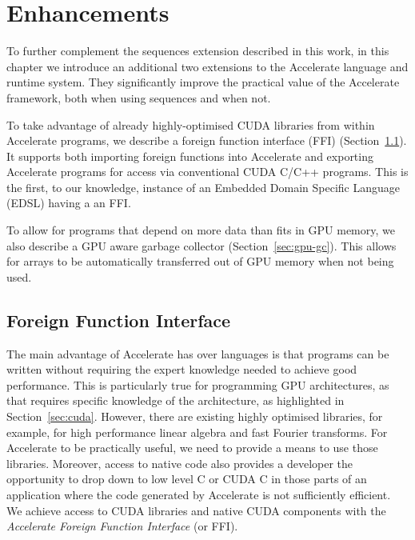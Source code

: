 \chapter{Enhancements}
\label{chap:enhancements}

To further complement the sequences extension described in this work, in this chapter we introduce an additional two extensions to the Accelerate language and runtime system. They significantly improve the practical value of the Accelerate framework, both when using sequences and when not.

To take advantage of already highly-optimised CUDA libraries from within Accelerate programs, we describe a foreign function interface (FFI) (Section~\ref{sec:foreign}). It supports both importing foreign functions into Accelerate and exporting Accelerate programs for access via conventional CUDA C/C++ programs. This is the first, to our knowledge, instance of an Embedded Domain Specific Language (EDSL) having a an FFI.

To allow for programs that depend on more data than fits in GPU memory, we also describe a GPU aware garbage collector (Section~\ref{sec:gpu-gc}). This allows for arrays to be automatically transferred out of GPU memory when not being used.


\section{Foreign Function Interface}
\label{sec:foreign}


The main advantage of Accelerate has over languages is that programs can be written without requiring the expert knowledge needed to achieve good performance. This is particularly true for programming GPU architectures, as that requires specific knowledge of the architecture, as highlighted in Section~\ref{sec:cuda}. However, there are existing highly optimised libraries, for example, for high performance linear algebra and fast Fourier transforms. For Accelerate to be practically useful, we need to provide a means to use those libraries. Moreover, access to native code also provides a developer the opportunity to drop down to low level C or CUDA C in those parts of an application where the code generated by Accelerate is not sufficiently efficient. We achieve access to CUDA libraries and native CUDA components with the \emph{Accelerate Foreign Function Interface} (or FFI).

